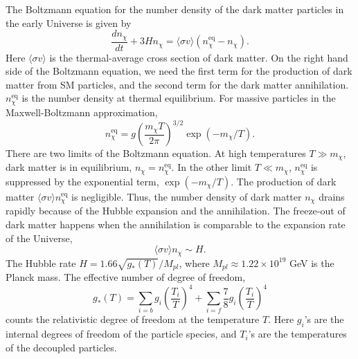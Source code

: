 \documentclass[doublespace,nopageskip]{VTthesis} %
\begin{document}
The Boltzmann equation for the number density of the dark matter particles in the early Universe is given by
\begin{equation}
    \frac{dn_\chi}{dt} + 3Hn_\chi = \langle\sigma v\rangle(n_\chi^{\mathrm{eq}} - n_\chi).
\end{equation}
Here $\langle\sigma v\rangle$ is the thermal-average cross section of dark matter. On the right hand side of the Boltzmann equation, we need the first term for the production of dark matter from SM particles, and the second term for the dark matter annihilation. $n_\chi^{\mathrm{eq}}$ is the number density at thermal equilibrium. For massive particles in the Maxwell-Boltzmann approximation,
\begin{equation}
    n_\chi^{\mathrm{eq}} = g\left( \frac{m_\chi T}{2\pi} \right)^{3/2}\exp(-m_\chi/T).
\end{equation}
There are two limits of the Boltzmann equation. At high temperatures $T \gg m_\chi$, dark matter is in equilibrium, $n_\chi = n_\chi^{\mathrm{eq}}$. In the other limit $T \ll m_\chi$, $n_\chi^{\mathrm{eq}}$ is suppressed by the exponential term, $\exp(-m_\chi/T)$. The production of dark matter $\langle\sigma v\rangle n_\chi^{\mathrm{eq}}$ is negligible. Thus, the number density of dark matter $n_\chi$ drains rapidly because of the Hubble expansion and the annihilation. The freeze-out of dark matter happens when the annihilation is comparable to the expansion rate of the Universe,
\begin{equation}
    \langle\sigma v\rangle n_\chi \sim H.
\end{equation}
The Hubble rate $H = 1.66\sqrt{g_*(T)}/M_{pl}$, where $M_{pl} \approx 1.22\times 10^{19}$ GeV is the Planck mass. The effective number of degree of freedom,
\begin{equation}
    g_*(T) = \sum_{i=b}g_i\left(\frac{T_i}{T}\right)^4 + \sum_{i=f}\frac{7}{8}g_i\left(\frac{T_i}{T}\right)^4
\end{equation}
counts the relativistic degree of freedom at the temperature $T$. Here $g_i$'s are the internal degrees of freedom of the particle species,  and $T_i$'s are the temperatures of the decoupled particles.
\end{document}
